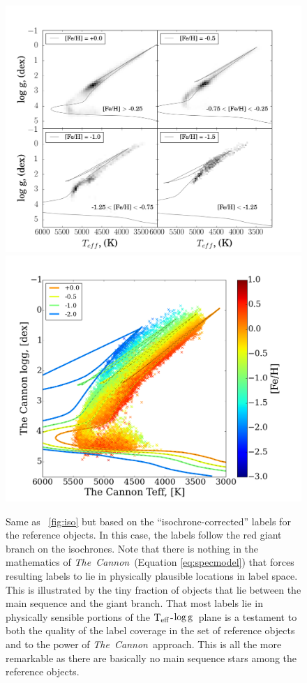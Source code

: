 \documentclass[12pt, preprint]{aastex}
\newcommand{\tc}{\textsl{The~Cannon}}
\newcommand{\teff}{\mbox{$\rm T_{eff}$}}
\newcommand{\logg}{\mbox{$\rm \log g$}}
\begin{document}
\begin{figure}[!h]
\centering
 \includegraphics[scale=0.25]{./plots/iso2_2.png}
  \hspace{-20pt}
    \includegraphics[scale=0.25]{./plots/iso2a_2.png}
\caption{Same as \figurename~\ref{fig:iso} but based on the ``isochrone-corrected'' labels for the reference objects. In this case, the labels follow the red giant branch on the isochrones. Note that there is nothing in the mathematics of \tc\ (Equation \ref{eq:specmodel}) that forces resulting labels to lie in physically plausible locations in label space. This is illustrated by the tiny fraction of objects that lie between the main sequence and the giant branch. That most labels lie in physically sensible portions of the \teff-\logg\ plane is a testament to both the quality of the label coverage in the set of reference objects and to the power of \tc\ approach. This is all the more remarkable as there are basically no main sequence stars among the reference objects.}
\label{fig:iso2}
\end{figure}
\end{document}
